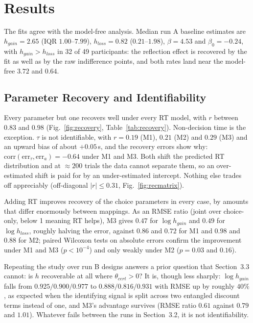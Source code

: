 \documentclass[11pt,a4paper]{article}
\begin{document}
\section{Results}

The fits agree with the model-free analysis. Median run A baseline estimates are
$h_{gain}=2.65$ (IQR $1.00$--$7.99$), $h_{loss}=0.82$ ($0.21$--$1.98$), $\beta=4.53$ and
$\beta_0=-0.24$, with $h_{gain}>h_{loss}$ in 32 of 49 participants: the reflection effect is
recovered by the fit as well as by the raw indifference points, and both rates land near the
model-free $3.72$ and $0.64$.

\subsection{Parameter Recovery and Identifiability}

Every parameter but one recovers well under every RT model, with $r$ between $0.83$ and $0.98$
(Fig.~\ref{fig:recovery}, Table~\ref{tab:recovery}). Non-decision time is the exception. $\tau$ is not identifiable, with $r=0.19$
(M1), $0.21$ (M2) and $0.29$ (M3) and an upward bias of about $+0.05$\,s, and the recovery
errors show why: $\mathrm{corr}(\text{err}_\tau,\text{err}_a)=-0.64$ under M1 and M3. Both shift
the predicted RT distribution and at $\approx200$ trials the data cannot separate them, so an
over-estimated shift is paid for by an under-estimated intercept. Nothing else trades off
appreciably (off-diagonal $|r|\le0.31$, Fig.~\ref{fig:recmatrix}).

Adding RT improves recovery of the choice parameters in every case, by amounts that differ
enormously between mappings. As an RMSE ratio (joint over choice-only, below 1 meaning RT
helps), M3 gives $0.47$ for $\log h_{gain}$ and $0.49$ for $\log h_{loss}$, roughly halving the
error, against $0.86$ and $0.72$ for M1 and $0.98$ and $0.88$ for M2; paired Wilcoxon tests on
absolute errors confirm the improvement under M1 and M3 ($p<10^{-4}$) and only weakly under M2
($p=0.03$ and $0.16$).

Repeating the study over run B designs answers a prior question that Section~3.3 cannot: is $h$
recoverable at all where $\theta_{cert}>0$? It is, though less sharply: $\log h_{gain}$ falls
from $0.925/0.900/0.977$ to $0.888/0.816/0.931$ with RMSE up by roughly $40\%$, as expected when
the identifying signal is split across two entangled discount terms instead of one, and M3's
advantage survives (RMSE ratio $0.61$ against $0.79$ and $1.01$). Whatever fails between the
runs in Section~3.2, it is not identifiability.
\end{document}
